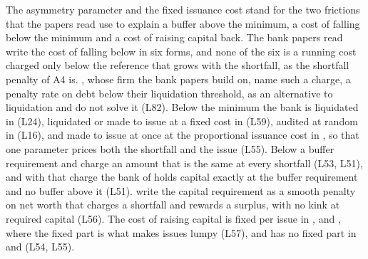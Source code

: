 The asymmetry parameter and the fixed issuance cost stand for the two frictions
that the papers read use to explain a buffer above the minimum, a cost of
falling below the minimum and a cost of raising capital back. The bank papers
read write the cost of falling below in six forms, and none of the six is a
running cost charged only below the reference that grows with the shortfall,
as the shortfall penalty of A4 is. \citet{milnerobertson1996}, whose firm the
bank papers build on, name such a charge, a penalty rate on debt below their
liquidation threshold, as an alternative to liquidation and do not solve it
(L82). Below the minimum the bank is liquidated in
\citet{peura2006} (L24), liquidated or made to issue at a fixed cost in
\citet{federico2026} (L59), audited at random in \citet{milnewhalley2001} (L16),
and made to issue at once at the proportional issuance cost in
\citet{glover2023}, so that one parameter prices both the shortfall and the
issue (L55). Below a buffer requirement \citet{behn2019} and \citet{langmenno2026}
charge an amount that is the same at every shortfall (L53, L51), and with that
charge the bank of \citet{langmenno2026} holds capital exactly at the
buffer requirement and no buffer above it (L51). \citet{lambertini2014} write the
capital requirement as a smooth penalty on net worth that charges a shortfall and
rewards a surplus, with no kink at required capital (L56). The cost of raising
capital is fixed per issue in \citet{milnewhalley2001}, \citet{peura2006} and
\citet{decamps2011}, where the fixed part is what makes issues lumpy (L57),
and has no fixed part in \citet{behn2019} and \citet{glover2023} (L54, L55).

